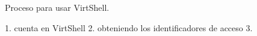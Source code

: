 Proceso para usar VirtShell.

1. cuenta en VirtShell
2. obteniendo los identificadores de acceso
3. 